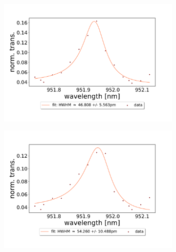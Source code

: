 \begin{figure}[h!] \ContinuedFloat
    \centering
    \begin{subfigure}[b]{0.49\textwidth}
        \includegraphics[width=\textwidth]{figures/results/double fano fits/20250326/21um_M3:M5_fit_7.pdf}
        \caption{}
        \label{fig:21um_M3:M5_fit_7}
    \end{subfigure}
    \begin{subfigure}[b]{0.49\textwidth}
        \includegraphics[width=\textwidth]{figures/results/double fano fits/20250326/21um_M3:M5_fit_8.pdf}
        \caption{}
        \label{fig:21um_M3:M5_fit_8}
    \end{subfigure}
    \begin{subfigure}[b]{0.49\textwidth}

\end{subfigure}
\end{figure}
